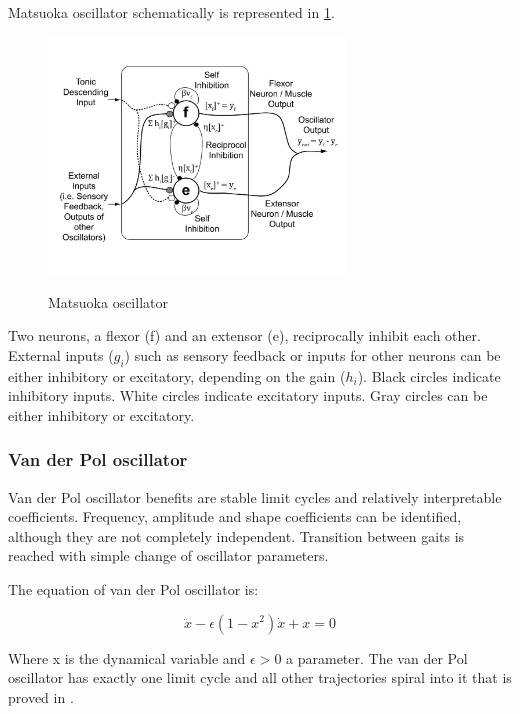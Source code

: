 \documentclass[12pt,a4paper]{report}
\begin{document}
				Matsuoka oscillator schematically is represented in \ref{fig:4}.
				\begin{figure}[h!]
					\vspace{-0.2cm}
					\centering
					{\includegraphics[width=0.7\textwidth]{4}}
					\caption{Matsuoka oscillator \cite{liu2008central}}
					\label{fig:4}
					\vspace{-0.1cm}
				\end{figure}
				
				Two neurons, a flexor (f) and an extensor (e), reciprocally inhibit each other. External inputs ($g_i$) such as sensory feedback or inputs for other neurons can be either inhibitory or excitatory, depending on the gain ($h_i$). Black circles indicate inhibitory inputs. White circles indicate excitatory inputs. Gray circles can be either inhibitory or excitatory.
			\subsubsection{Van der Pol oscillator}
				Van der Pol oscillator benefits are stable limit cycles and relatively interpretable coefficients. Frequency, amplitude and shape coefficients can be identified, although they are not completely independent. Transition between gaits is reached with simple change of oscillator parameters.
				
				The equation of van der Pol oscillator is:
				
				\begin{equation}\label{eq:Pol1}
					\ddot{x} - \epsilon(1 - x^2)\dot{x} + x = 0
				\end{equation}
				
				Where x is the dynamical variable and $\epsilon > 0$ a parameter.
				The van der Pol oscillator has exactly one limit cycle and all other trajectories spiral into it that is proved in \cite{kanamaru2007van}.
\end{document}
